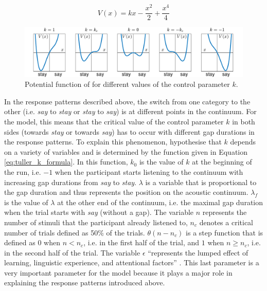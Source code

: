 \begin{equation}
V(x) = kx - \frac{x^2}{2} + \frac{x^4}{4}
\label{eq:tuller_potential_equation}
\end{equation}

\begin{figure}[h]
\begin{center}
\includegraphics[width=\textwidth]{figures/ch3/tuller_potential.pdf}
\caption{Potential function of \citet{Tulleretal1994} for different values of the control parameter $k$.}
\label{fig:tuller_potential}
\end{center}
\end{figure}

In the response patterns described above, the switch from one category to the other (i.e. \emph{say} to \emph{stay} or \emph{stay} to \emph{say}) is at different points in the continuum. For the model, this means that the critical value of the control parameter $k$ in both sides (towards \emph{stay} or towards \emph{say}) has to occur with different gap durations in the response patterns. To explain this phenomenon, \citet{Tulleretal1994} hypothesise that $k$ depends on a variety of variables and is determined by the function given in Equation \ref{eq:tuller_k_formula}. In this function, $k_0$ is the value of $k$ at the beginning of the run, i.e. $-1$ when the participant starts listening to the continuum with increasing gap durations from \emph{say} to \emph{stay}. $\lambda$ is a variable that is proportional to the gap duration and thus represents the position on the acoustic continuum. $\lambda_f$ is the value of $\lambda$ at the other end of the continuum, i.e. the maximal gap duration when the trial starts with \emph{say} (without a gap). The variable $n$ represents the number of stimuli that the participant already listened to, $n_c$ denotes a critical number of trials defined as 50\% of the trials. $\theta(n-n_c)$ is a step function that is defined as $0$ when $n < n_c$, i.e. in the first half of the trial, and $1$ when $n \geq n_c$, i.e. in the second half of the trial. The variable $\epsilon$ ``represents the lumped effect of learning, linguistic experience, and attentional factors” \citep[8]{Tulleretal1994}. This last parameter is a very important parameter for the model because it plays a major role in explaining the response patterns introduced above.


